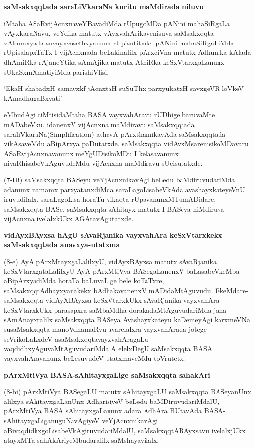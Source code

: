 \noindent
\textbf{saMsakxqqtada saraLiVkaraNa kuritu maMdirada niluvu}\label{page33}

iMtaha ASaRvijAcnxnaveYBavadiMda rUpugoMDa pANini mahaSiRgaLa vAyxkaraNavu, veYdika matutx vAyxvahArikavenisuva saMsakxqqta vAknmxyada suvayxvasethxyanunx rUpisutitxde. pANini mahaSiRgaLiMda rUpisalapxTaTx I vijAcnxnada beLakinalilx-pArxciVna matutx Adhunika kAlada dhAmiRka-rAjaneYtika-sAmAjika matutx AthiRka keSxVtarxgaLanunx sUkaSxmXmatiyiMda parishiVlisi,

\begin{shloka}
`EkaH shabadxH samayxkf jAcnxtaH suSuThx parxyukatxH savxgeVR loVkeV kAmadhugaBxvati'\label{35}
\end{shloka}

eMbudAgi ciMtisidaMtaha BASA vayxvahAravu rUDhige baruvaMte mADabeVku. idanenxV vijAcnxna maMdiravu saMsakxqqtada saraliVkaraNa{(\rm Simplification)} athavA pArxthamikavAda saMsakxqqtada vikAsaveMdu aBipArxya paDutatxde. saMsakxqqta vidAvxMsarenisikoMDavaru ASaRvijAcnxnavanunx meYgUDisikoMDu I kelasavanunx nivaRhisabeVkAguvudeMdu vijAcnxna maMdiravu sUcisutatxde.

(7-Di) saMsakxqqta BASeyu veYjAcnxnikavAgi beLedu baMdiruvudariMda adanunx namamx parxyatanxdiMda saraLagoLisabeVkAda avashayxkateyeVnU  iruvudilalx. saraLagoLisa horaTu vikaqta rUpavanunxMTumADidare, saMsakxqqta BASe, saMsakxqqta sAhitayx matutx I BASeya hiMdiruva vijAcnxna ivelalxkUkx AGAtavAgutatxde.

\noindent
\textbf{vidAyxBAyxsa hAgU sAvaRjanika vayxvahAra keSxVtarxkekx saMsakxqqtada anavxya-utatxma}\label{page36}

(8-e) AyA pArxMtayxgaLalilxyU, vidAyxBAyxsa matutx sAvaRjanika keSxVtarxgataLalilxyU AyA pArxMtiVya BASegaLanenxV baLasabeVkeMba aBipArxyadiMda horaTa baLuvaLige bele koTaTxre, saMsakxqqtAdhayxyanakekx bAdhakavanenxV mADidaMtAguvudu. EkeMdare-saMsakxqqta vidAyXBAyxsa keSxVtarxkUkx sAvaRjanika vayxvahAra keSxVtarxkUkx parasapxra saMbaMdha dorakadaMtAguvudariMda jana sAmAnayxralilx saMsakxqqta BASeya Avashayxkateyu kaDemeyAgi karxmeVNa susaMsakxqqta manoVdhamaRvu avarelalxra vayxvahArada jotege seVrikoLaLxdeV asaMsakxqqtavayxvahAragaLu vaqdidhxyAguvaMtAguvudariMda A elelxDegU saMsakxqqta BASA vayxvahAravanunx beLesuvudeV utatxmaveMdu toVrutetx.

\noindent
\textbf{pArxMtiVya BASA-sAhitayxgaLige saMsakxqqta sahakAri}\label{page36}

(8-bi) pArxMtiVya BASegaLU matutx sAhitayxgaLU saMsakxqqta BASeyanUnx alilxya sAhitayxgaLanUnx AdharisiyeV beLedu baMDiruvudariMdalU, pArxMtiVya BASA sAhitayxgaLanunx adara AdhAra BUtavAda BASA-sAhitayxgaLiganuguNavAgiyeV veYjAcnxnikavAgi aBivaqdidhxgoLisabeVkAgiruvudariMdalU, saMsakxqqtABAyxsavu ivelalxjUkx atayxMTa sahAkAriyeMbudaralilx saMshayavilalx.

